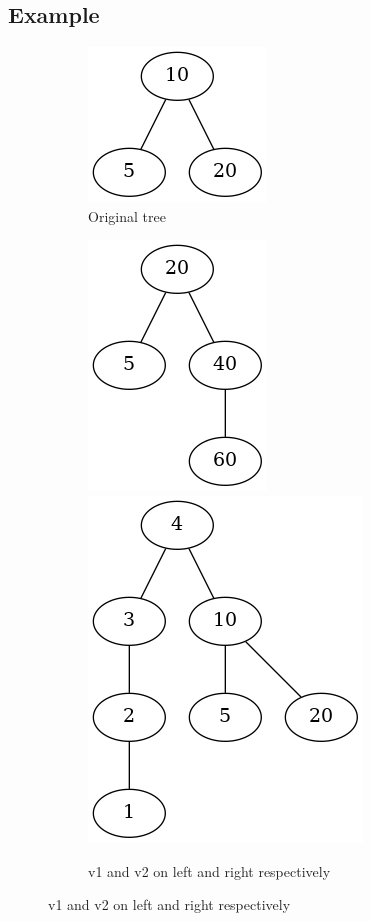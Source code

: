 \documentclass{article}
\begin{document}
\subsection{Example}
\begin{figure}[H]
  \begin{subfigure}{\linewidth}
  \begin{center}
  \includegraphics[height=.2\textheight,keepaspectratio]{set-avl-original.png}
  \end{center}
  \caption{Original tree}
  \end{subfigure}\par\medskip
  \begin{subfigure}{\linewidth}
  \includegraphics[width=.3\linewidth, height=.3\textheight,keepaspectratio]{set-avl-v1.png}\hfill
  \includegraphics[width=.4\linewidth,height=.4\textheight,keepaspectratio]{set-avl-v2.png}
  \caption{v1 and v2 on left and right respectively}
  \end{subfigure}\par\medskip

\end{figure}
\end{document}
